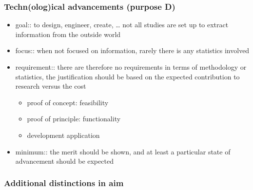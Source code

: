 \documentclass[]{article}
\providecommand{\tightlist}{%
  \setlength{\itemsep}{0pt}\setlength{\parskip}{0pt}}
\begin{document}
\subsubsection{Techn(olog)ical advancements (purpose
D)}\label{technological-advancements-purpose-d}

\begin{itemize}
\tightlist
\item
  goal:: to design, engineer, create, \ldots{} not all studies are set
  up to extract information from the outside world
\item
  focus:: when not focused on information, rarely there is any
  statistics involved
\item
  requirement:: there are therefore no requirements in terms of
  methodology or statistics, the justification should be based on the
  expected contribution to research versus the cost

  \begin{itemize}
  \tightlist
  \item
    proof of concept: feasibility
  \item
    proof of principle: functionality
  \item
    development application
  \end{itemize}
\item
  minimum:: the merit should be shown, and at least a particular state
  of advancement should be expected
\end{itemize}

\subsubsection{Additional distinctions in
aim}\label{additional-distinctions-in-aim}
\end{document}
